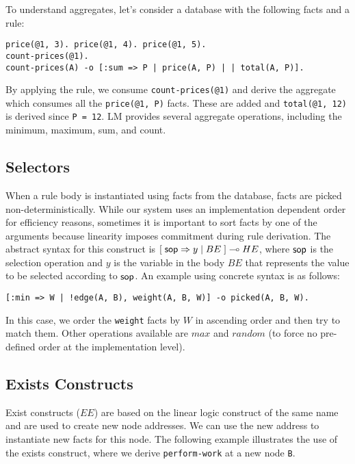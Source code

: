 To understand aggregates, let's consider a database with the following facts and a rule:

\begin{Verbatim}
price(@1, 3). price(@1, 4). price(@1, 5).
count-prices(@1).
count-prices(A) -o [:sum => P | price(A, P) | | total(A, P)].
\end{Verbatim}

By applying the rule, we consume \texttt{count-prices(@1)} and
derive the aggregate which consumes all the \texttt{price(@1, P)} facts.
These are added and \texttt{total(@1,~12)} is derived since \texttt{P~=~12}.
LM provides several aggregate operations, including the minimum, maximum, sum, and count.

\subsection{Selectors}

When a rule body is instantiated using facts from the database, facts are picked
non-deterministically. While our system uses an implementation dependent order for
efficiency reasons, sometimes it is important to sort facts by one of the arguments
because linearity imposes commitment during rule derivation. The abstract syntax for
this construct is $[\; \mathsf{sop} \Rightarrow y \; | \; BE \;] \multimap HE$, where
$\mathsf{sop}$ is the selection operation and $y$ is the variable in the body $BE$ that
represents the value to be selected according to $\mathsf{sop}$.
An example using concrete syntax is as follows:

\begin{Verbatim}
[:min => W | !edge(A, B), weight(A, B, W)] -o picked(A, B, W).
\end{Verbatim}

In this case, we order the \texttt{weight} facts by $W$ in ascending order and then try
to match them. Other operations available are $max$ and $random$ (to force no pre-defined order at the
implementation level).

\subsection{Exists Constructs}

Exist constructs ($EE$) are based on the linear logic construct of the same name and are used to create new node addresses.
We can use the new address to instantiate new facts for this node.  
The following example illustrates the use of the exists construct, where we derive
\texttt{perform-work} at a new node \texttt{B}.

